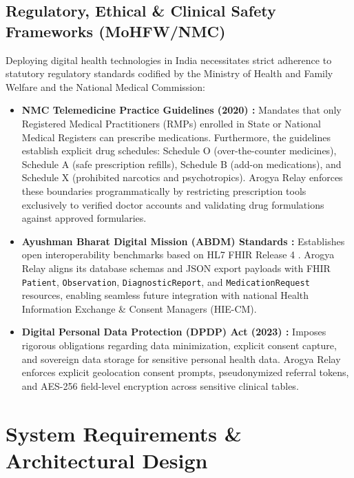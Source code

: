 \documentclass[12pt,a4paper,oneside]{report}
\begin{document}
\enlargethispage{2\baselineskip}
\section{Regulatory, Ethical \& Clinical Safety Frameworks (MoHFW/NMC)}
Deploying digital health technologies in India necessitates strict adherence to statutory regulatory standards codified by the Ministry of Health and Family Welfare and the National Medical Commission:

\begin{itemize}[leftmargin=1.5em,itemsep=1pt,topsep=1pt,parsep=0pt]
    \item \textbf{NMC Telemedicine Practice Guidelines (2020) \cite{nmc2020}:} Mandates that only Registered Medical Practitioners (RMPs) enrolled in State or National Medical Registers can prescribe medications. Furthermore, the guidelines establish explicit drug schedules: Schedule O (over-the-counter medicines), Schedule A (safe prescription refills), Schedule B (add-on medications), and Schedule X (prohibited narcotics and psychotropics). Arogya Relay enforces these boundaries programmatically by restricting prescription tools exclusively to verified doctor accounts and validating drug formulations against approved formularies.
    \item \textbf{Ayushman Bharat Digital Mission (ABDM) Standards \cite{abdm2022}:} Establishes open interoperability benchmarks based on HL7 FHIR Release 4 \cite{fhir2020}. Arogya Relay aligns its database schemas and JSON export payloads with FHIR \texttt{Patient}, \texttt{Observation}, \texttt{DiagnosticReport}, and \texttt{MedicationRequest} resources, enabling seamless future integration with national Health Information Exchange \& Consent Managers (HIE-CM).
    \item \textbf{Digital Personal Data Protection (DPDP) Act (2023) \cite{dpdp2023}:} Imposes rigorous obligations regarding data minimization, explicit consent capture, and sovereign data storage for sensitive personal health data. Arogya Relay enforces explicit geolocation consent prompts, pseudonymized referral tokens, and AES-256 field-level encryption across sensitive clinical tables.
\end{itemize}

\chapter{System Requirements \& Architectural Design}
\end{document}
